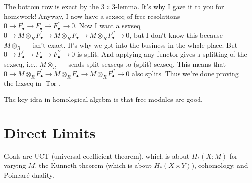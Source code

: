\documentclass{amsart}
\theoremstyle{theorem}
\theoremstyle{definition}
\DeclareMathOperator{\Tor}{Tor}
\begin{document}
The bottom row is exact by the $3\times 3$-lemma. It's why I gave it to you for homework! Anyway, I now have a sexseq of free resolutions $0\to F^\prime_\bullet\to F_\bullet\to F^{\prime\prime}_\bullet\to 0$. Now I want a sexseq $0\to M\otimes_R F^\prime_\bullet\to M\otimes_R F_\bullet\to M\otimes_R F^{\prime\prime}_\bullet\to 0$, but I don't know this because $M\otimes_R -$ isn't exact. It's why we got into the business in the whole place. But $0\to F^\prime_\bullet\to F_\bullet\to F^{\prime\prime}_\bullet\to 0$ is split. And applying any functor gives a splitting of the sexseq, i.e., $M\otimes_R -$ sends split sexseqs to (split) sexseq. This means that $0\to M\otimes_R F^\prime_\bullet\to M\otimes_R F_\bullet\to M\otimes_R F^{\prime\prime}_\bullet\to 0$ also splits. Thus we're done proving the lexseq in $\Tor$.

The key idea in homological algebra is that free modules are good.
\section{Direct Limits}
Goals are UCT (universal coefficient theorem), which is about $ H_\ast(X;M)$ for varying $M$, the K\"{u}nneth theorem (which is about $ H_\ast(X\times Y)$), cohomology, and Poincar\'{e} duality.
\end{document}
